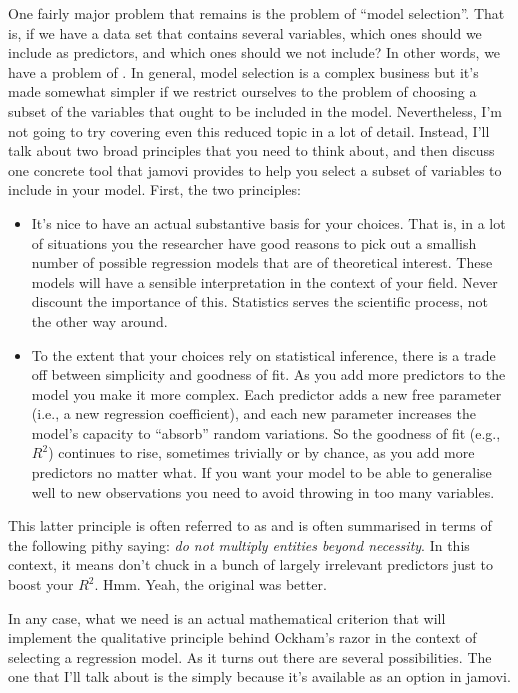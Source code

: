 One fairly major problem that remains is the problem of ``model selection''. That is, if we have a data set that contains several variables, which ones should we include as predictors, and which ones should we not include? In other words, we have a problem of . In general, model selection is a complex business but it's made somewhat simpler if we restrict ourselves to the problem of choosing a subset of the variables that ought to be included in the model. Nevertheless, I'm not going to try covering even this reduced topic in a lot of detail. Instead, I'll talk about two broad principles that you need to think about, and then discuss one concrete tool that jamovi provides to help you select a subset of variables to include in your model. First, the two principles:
\begin{itemize}
\item It's nice to have an actual substantive basis for your choices. That is, in a lot of situations you the researcher have good reasons to pick out a smallish number of possible regression models that are of theoretical interest. These models will have a sensible interpretation in the context of your field. Never discount the importance of this. Statistics serves the scientific process, not the other way around. 
\item To the extent that your choices rely on statistical inference, there is a trade off between simplicity and goodness of fit. As you add more predictors to the model you make it more complex. Each predictor adds a new free parameter (i.e., a new regression coefficient), and each new parameter increases the model's capacity to ``absorb'' random variations. So the goodness of fit (e.g., $R^2$) continues to rise, sometimes trivially or by chance, as you add more predictors no matter what. If you want your model to be able to generalise well to new observations you need to avoid throwing in too many variables. 
\end{itemize}
This latter principle is often referred to as  and is often summarised in terms of the following pithy saying: {\it do not multiply entities beyond necessity}. In this context, it means don't chuck in a bunch of largely irrelevant predictors just to boost your $R^2$. Hmm. Yeah, the original was better. 

In any case, what we need is an actual mathematical criterion that will implement the qualitative principle behind Ockham's razor in the context of selecting a regression model. As it turns out there are several possibilities. The one that I'll talk about is the  \parencite[AIC; ][]{Akaike1974} simply because it's available as an option in jamovi. 

